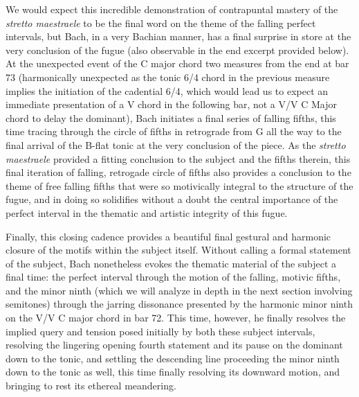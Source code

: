 We would expect this incredible demonstration of contrapuntal mastery of
the \emph{stretto maestraele} to be the final word on the theme of the
falling perfect intervals, but Bach, in a very Bachian manner, has a
final surprise in store at the very conclusion of the fugue (also
observable in the end excerpt provided below). At the unexpected event
of the C major chord two measures from the end at bar 73 (harmonically
unexpected as the tonic 6/4 chord in the previous measure implies the
initiation of the cadential 6/4, which would lead us to expect an
immediate presentation of a V chord in the following bar, not a V/V C
Major chord to delay the dominant), Bach initiates a final series of
falling fifths, this time tracing through the circle of fifths in
retrograde from G all the way to the final arrival of the B-flat tonic
at the very conclusion of the piece. As the \emph{stretto maestraele}
provided a fitting conclusion to the subject and the fifths therein,
this final iteration of falling, retrogade circle of fifths also
provides a conclusion to the theme of free falling fifths that were so
motivically integral to the structure of the fugue, and in doing so
solidifies without a doubt the central importance of the perfect
interval in the thematic and artistic integrity of this fugue.

Finally, this closing cadence provides a beautiful final gestural and
harmonic closure of the motifs within the subject itself. Without
calling a formal statement of the subject, Bach nonetheless evokes the
thematic material of the subject a final time: the perfect interval
through the motion of the falling, motivic fifths, and the minor ninth
(which we will analyze in depth in the next section involving semitones)
through the jarring dissonance presented by the harmonic minor ninth on
the V/V C major chord in bar 72. This time, however, he finally resolves
the implied query and tension posed initially by both these subject
intervals, resolving the lingering opening fourth statement and its
pause on the dominant down to the tonic, and settling the descending
line proceeding the minor ninth down to the tonic as well, this time
finally resolving its downward motion, and bringing to rest its ethereal
meandering.



